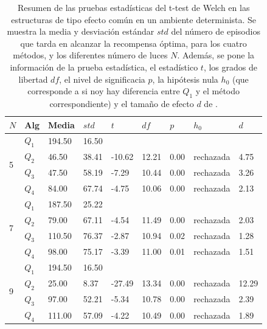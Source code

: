 \clearpage

\begin{table}[]
\centering
\caption{\footnotesize{Resumen de las pruebas estadísticas del t-test de Welch en las
estructuras de tipo efecto común en un ambiente determinista. Se muestra la media y desviación estándar $std$ del número 
de episodios que tarda en alcanzar la recompensa óptima, para los cuatro métodos, y los diferentes número de luces $N$. Además, se pone la información
de la prueba estadística, el estadístico $t$, los grados de libertad $df$, el nivel
de significacia $p$, la hipótesis nula $h_0$ (que corresponde a si noy hay diferencia entre $Q_1$ y el método correspondiente) y el tamaño de efecto $d$ de \citet{cohen2013statistical}.}}
\label{tab:dqn-common-effect-det}
\begin{tabular}{|l|l|l|l|l|l|l|l|l|}
\hline
$N$ & Alg & Media & $std$ & $t$ & $df$ & $p$ & $h_0$ & $d$ \\ \hline
\multirow{4}{*}{5} & $Q_1$ & 194.50 & 16.50 & \multicolumn{5}{l|}{} \\ \cline{2-9} 
 & $Q_2$ & 46.50 & 38.41 & -10.62 & 12.21 & 0.00 & rechazada & 4.75 \\ \cline{2-9} 
 & $Q_3$ & 47.50 & 58.19 & -7.29 & 10.44 & 0.00 & rechazada & 3.26 \\ \cline{2-9} 
 & $Q_4$ & 84.00 & 67.74 & -4.75 & 10.06 & 0.00 & rechazada & 2.13 \\ \hline
\multirow{4}{*}{7} & $Q_1$ & 187.50 & 25.22 & \multicolumn{5}{l|}{} \\ \cline{2-9} 
 & $Q_2$ & 79.00 & 67.11 & -4.54 & 11.49 & 0.00 & rechazada & 2.03 \\ \cline{2-9} 
 & $Q_3$ & 110.50 & 76.37 & -2.87 & 10.94 & 0.02 & rechazada & 1.28 \\ \cline{2-9} 
 & $Q_4$ & 98.00 & 75.17 & -3.39 & 11.00 & 0.01 & rechazada & 1.51 \\ \hline
\multirow{4}{*}{9} & $Q_1$ & 194.50 & 16.50 & \multicolumn{5}{l|}{} \\ \cline{2-9} 
 & $Q_2$ & 25.00 & 8.37 & -27.49 & 13.34 & 0.00 & rechazada & 12.29 \\ \cline{2-9} 
 & $Q_3$ & 97.00 & 52.21 & -5.34 & 10.78 & 0.00 & rechazada & 2.39 \\ \cline{2-9} 
 & $Q_4$ & 111.00 & 57.09 & -4.22 & 10.49 & 0.00 & rechazada & 1.89 \\ \hline
\end{tabular}
\end{table}

